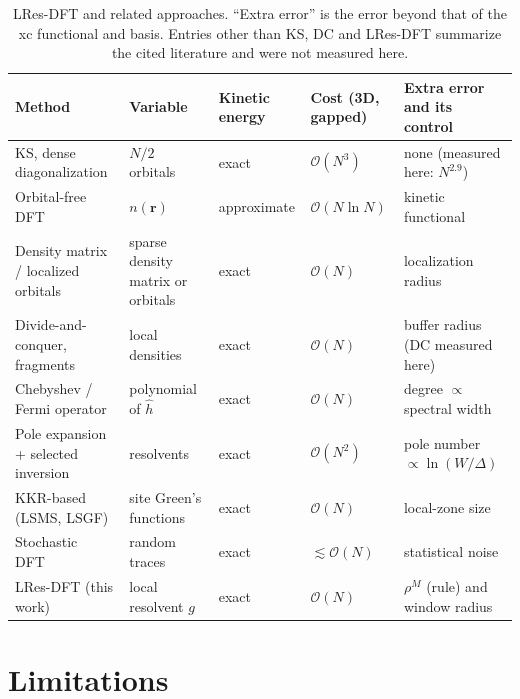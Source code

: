 \documentclass[aps,prb,twocolumn,superscriptaddress,floatfix,longbibliography]{revtex4-2}
\theoremstyle{remark}
\begin{document}
\begin{table}[t]
\caption{\label{tab:methods}
LRes-DFT and related approaches. ``Extra error'' is the error beyond that of the xc functional and basis. Entries other than
KS, DC and LRes-DFT summarize the cited literature and were not measured here.}
\begin{ruledtabular}
\footnotesize
\begin{tabular}{p{4.0cm}p{2.7cm}p{2.0cm}p{2.3cm}p{5.6cm}}
Method & Variable & Kinetic energy & Cost (3D, gapped) & Extra error and its control \\
\hline
KS, dense diagonalization & $N/2$ orbitals & exact & $\mathcal O(N^3)$ & none (measured here: $N^{2.9}$) \\
Orbital-free DFT~\cite{WangTeter1992,WGC1999,HuangCarter2010} & $n(\bm r)$ & approximate & $\mathcal O(N\ln N)$ & kinetic functional \\
Density matrix / localized orbitals~\cite{LNV1993,ONETEP2005,MGC1993,BigDFTLS2014} & sparse density matrix or orbitals & exact & $\mathcal O(N)$ & localization radius \\
Divide-and-conquer, fragments~\cite{Yang1991,LS3DF2008} & local densities & exact & $\mathcal O(N)$ & buffer radius (DC measured here) \\
Chebyshev / Fermi operator~\cite{Goedecker1999,WeisseKPM2006} & polynomial of $\hat h$ & exact & $\mathcal O(N)$ & degree $\propto$ spectral width \\
Pole expansion + selected inversion~\cite{LinLuYingE2009,PEXSI2013,Moussa2016} & resolvents & exact & $\mathcal O(N^2)$ & pole number $\propto\ln(W/\Delta)$ \\
KKR-based (LSMS, LSGF)~\cite{LSMS1995,LSGF1996,Zeller2008} & site Green's functions & exact & $\mathcal O(N)$ & local-zone size \\
Stochastic DFT~\cite{BaerSDFT2013} & random traces & exact & $\lesssim\mathcal O(N)$ & statistical noise \\
LRes-DFT (this work) & local resolvent $g$ & exact & $\mathcal O(N)$ & $\rho^M$ (rule) and window radius \\
\end{tabular}
\end{ruledtabular}
\end{table}

\section{Limitations}\label{sec:limits}
\end{document}
